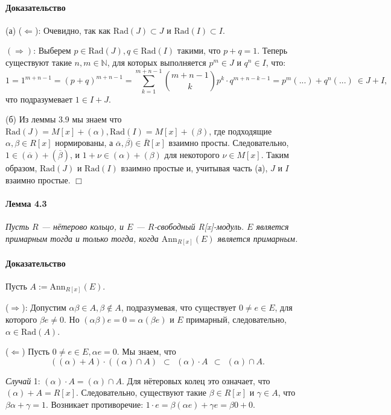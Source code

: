 \documentclass[a4paper,12pt]{article}
\newcommand{\Ann}{\text{Ann}}
\newcommand{\Rad}{\text{Rad}}
\begin{document}
\paragraph{Доказательство}
(а) ($\Leftarrow$): Очевидно, так как $\Rad(J) \subset J$ и $\Rad(I) \subset I$.

$(\Rightarrow)$: Выберем $p \in \Rad(J), q \in \Rad(I)$ такими, что $p + q = 1$. Теперь существуют такие $n, m \in \mathbb{N}$, для которых выполняется $p^m \in J$ и $q^n \in I$, что:
$$
1 = 1^{m+n-1} = (p + q)^{m+n-1} = \sum_{k=1}^{m+n-1} \binom{m+n-1}{k}p^k \cdot q^{m+n-k-1} = p^m (...) + q^n (...) ~ \in J+I,
$$
что подразумевает $1 \in I+J$.

(б) Из леммы 3.9 мы знаем что $\Rad(J) = M[x] + (\alpha), \Rad(I) = M[x]+(\beta)$, где подходящие $\alpha, \beta \in R[x]$ нормированы, а $\overline{\alpha}, \overline{\beta)} \in \overline{R}[x]$ взаимно просты. Следовательно, $1 \in (\overline{\alpha}) + (\overline{\beta})$, и $1 + \nu \in (\alpha) + (\beta)$ для некоторого $\nu \in M[x]$. Таким образом, $\Rad(J)$ и $\Rad(I)$ взаимно простые и, учитывая часть (а), $J$ и $I$ взаимно простые.
$\Box$

\paragraph{Лемма 4.3}
{\itshape
Пусть $R$ --- нётерово кольцо, и $E$ --- $R$-свободный R[x]-модуль. $E$ является примарным тогда и только тогда, когда $\Ann_{R[x]}(E)$ является примарным.
}

\paragraph{Доказательство}
Пусть $A := \Ann_{R[x]}(E)$.

($\Rightarrow$): Допустим $\alpha \beta \in A, \beta \notin A$, подразумевая, что существует $0 \ne e \in E$, для которого $\beta e \ne 0$. Но $(\alpha \beta)e = 0 = \alpha (\beta e)$ и $E$ примарный, следовательно, $\alpha \in \Rad(A)$.

($\Leftarrow$) Пусть $0 \ne e \in E, \alpha e = 0$. Мы знаем, что
$$((\alpha)+A) \cdot ((\alpha) \cap A) ~~ \subset ~~ (\alpha) \cdot A ~~ \subset ~~ (\alpha) \cap A.$$

\textit{Случай} 1: $(\alpha) \cdot A = (\alpha) \cap A$. Для нётеровых колец это означает, что $(\alpha) + A = R[x]$. Следовательно, существуют такие $\beta \in R[x]$ и $\gamma \in A$, что $\beta \alpha + \gamma = 1$. Возникает противоречие: $1 \cdot e = \beta (\alpha e) + \gamma e = \beta 0 + 0$. 
\end{document}
